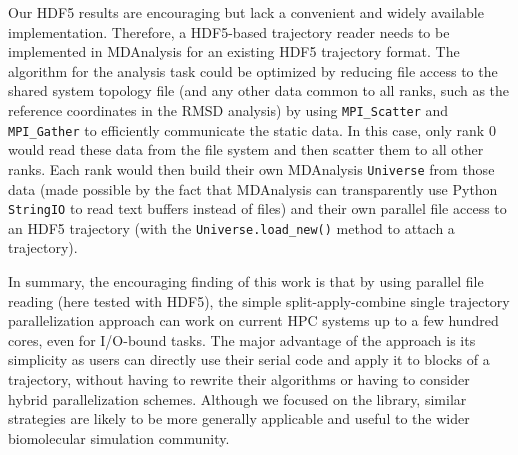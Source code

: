 Our HDF5 results are encouraging but lack a convenient and widely available implementation.
Therefore, a HDF5-based trajectory reader needs to be implemented in MDAnalysis for an existing HDF5 trajectory format.
The algorithm for the analysis task could be optimized by reducing file access to the shared system topology file (and any other data common to all ranks, such as the reference coordinates in the RMSD analysis) by using \texttt{MPI\_Scatter} and \texttt{MPI\_Gather} to efficiently communicate the static data.
In this case, only rank 0 would read these data from the file system and then scatter them to all other ranks.
Each rank would then build their own MDAnalysis \texttt{Universe} from those data (made possible by the fact that MDAnalysis can transparently use Python \texttt{StringIO} to read text buffers instead of files) and their own parallel file access to an HDF5 trajectory (with the \texttt{Universe.load\_new()} method to attach a trajectory).

In summary, the encouraging finding of this work is that by using parallel file reading (here tested with HDF5), the simple split-apply-combine single trajectory parallelization approach can work on current HPC systems up to a few hundred cores, even for I/O-bound tasks.
The major advantage of the approach is its simplicity as users can directly use their serial code and apply it to blocks of a trajectory, without having to rewrite their algorithms or having to consider hybrid parallelization schemes. 
Although we focused on the  library, similar strategies are likely to be more generally applicable and useful to the wider biomolecular simulation community.




